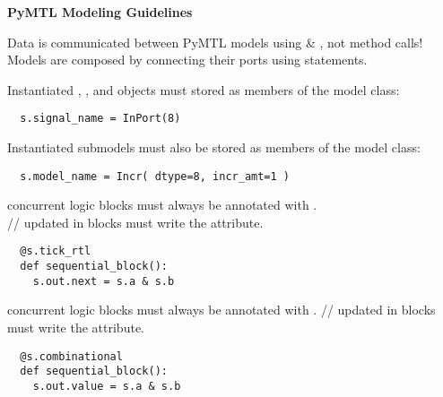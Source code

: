 \documentclass{cbxdoc}
\begin{document}
\begin{landscape}
\begin{minipage}[t]{3.25in}
\colorbox{gray!30!white}{\parbox{1.025\tw}{\rule[-0.4em]{0pt}{1.4em}\centering\textbf{%
  PyMTL Modeling Guidelines%
}}}

\smallskip\smallskip\raggedright
\begin{cbxlist}{1.5em}{0em}{1em}

  \item Data is communicated between PyMTL models using  \&
     , not method calls! Models are composed
      by connecting their ports using 
     statements.

  \item Instantiated , , and  objects must
         stored as members of the model class:

\begin{verbatim}
  s.signal_name = InPort(8)
\end{verbatim}

  \item Instantiated submodels must also be stored as members of the
     model class:

\begin{verbatim}
  s.model_name = Incr( dtype=8, incr_amt=1 )
\end{verbatim}

  \item {} concurrent logic blocks must always be annotated
     with . \\
     // updated in 
     blocks must write the  attribute.

\begin{verbatim}
  @s.tick_rtl
  def sequential_block():
    s.out.next = s.a & s.b
\end{verbatim}

  \item {} concurrent logic blocks must always be
     annotated with .
     // updated in 
     blocks must write the  attribute.

\begin{verbatim}
  @s.combinational
  def sequential_block():
    s.out.value = s.a & s.b
\end{verbatim}

\end{cbxlist}

\end{minipage}%

\end{landscape}
\end{document}
